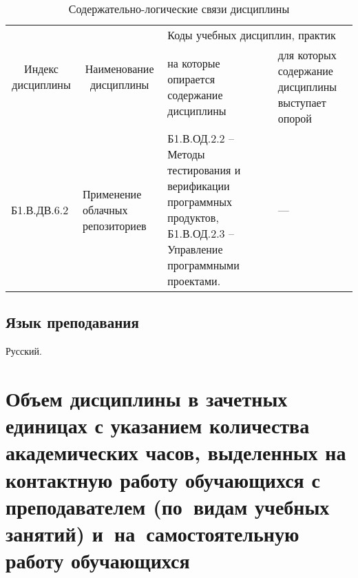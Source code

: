 \documentclass[a4paper,12pt]{article}
\begin{document}
  \begin{table}[H]
  \setlength\arraycolsep{3pt}
  \caption{Содержательно-логические связи дисциплины}
  \begin{tabular}{|l|p{18ex}|*{2}{p{23ex}|}}
  \hline
  \multicolumn{1}{|c|}{\multirow{2}{13ex}{\centering Индекс \linebreak дисциплины}} &
  \multicolumn{1}{c|}{\multirow{2}{18ex}{\centering Наименование \linebreak дисциплины}} & 
  \multicolumn{2}{p{46ex}|}{\centering Коды учебных дисциплин, практик} \\
  \cline{3-4}
   & & 
  \centering на которые опирается содержание дисциплины & 
  \centering\arraybackslash для которых содержание дисциплины выступает опорой
  \\ \hline
  Б1.В.ДВ.6.2 & Применение облачных репозиториев 
  & 
  \raggedright
  
  Б1.В.ОД.2.2 -- Методы тестирования и верификации программных продуктов,\newline
  Б1.В.ОД.2.3 -- Управление программными проектами. 
  & 
  \raggedright\arraybackslash
  
  --- 
  \\ \hline
  \end{tabular}
  \end{table}


\subsection{Язык преподавания} 
  Русский.
  



\newpage

\section{Объем дисциплины в зачетных единицах с указанием количества академических часов, выделенных на контактную работу обучающихся с преподавателем (по~видам учебных занятий) и~на~самостоятельную работу обучающихся}
\end{document}

